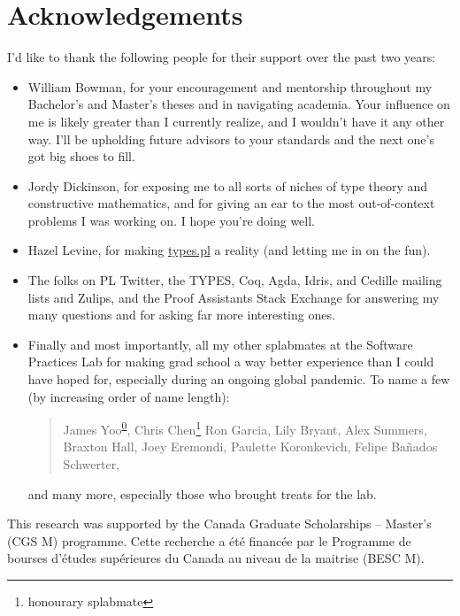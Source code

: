 \chapter{Acknowledgements}

I'd like to thank the following people for their support over the past two years:

\begin{itemize}
  \item William Bowman, for your encouragement and mentorship throughout my Bachelor's and Master's theses
    and in navigating academia.
    Your influence on me is likely greater than I currently realize,
    and I wouldn't have it any other way.
    I'll be upholding future advisors to your standards and the next one's got big shoes to fill.
  \item Jordy Dickinson, for exposing me to all sorts of niches of type theory and constructive mathematics,
    and for giving an ear to the most out-of-context problems I was working on.
    I hope you're doing well.
  \item Hazel Levine, for making \href{https://types.pl/}{types.pl} a reality (and letting me in on the fun).
  \item The folks on PL Twitter, the TYPES, Coq, Agda, Idris, and Cedille mailing lists and Zulips,
    and the Proof Assistants Stack Exchange for answering my many questions
    and for asking far more interesting ones.
  \item Finally and most importantly, all my other splabmates at the Software Practices Lab
    for making grad school a way better experience than I could have hoped for,
    especially during an ongoing global pandemic.
    To name a few (by increasing order of name length):
    \begin{quote}
    James Yoo\textsuperscript{\href{https://youtu.be/dQw4w9WgXcQ}{0}}, Chris Chen\punctstack{,}\footnote{honourary splabmate}
    Ron Garcia, Lily Bryant, Alex Summers, Braxton Hall, Joey Eremondi, Paulette Koronkevich, Felipe Ba\~nados Schwerter,
    \end{quote}
    and many more, especially those who brought treats for the lab.
\end{itemize}

\vfill

\noindent This research was supported by the Canada Graduate Scholarships -- Master’s (CGS M) programme.
Cette recherche a \'et\'e financ\'ee par le Programme de bourses d'\'etudes sup\'erieures
du Canada au niveau de la maitrise (BESC M).

\hfill